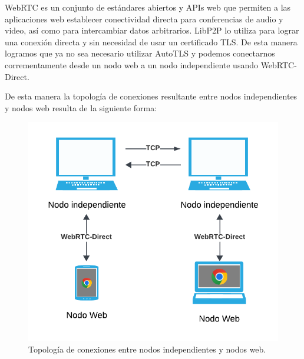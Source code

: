 WebRTC es un conjunto de estándares abiertos y APIs web que permiten a las aplicaciones web establecer conectividad directa para conferencias de audio y video, así como para intercambiar datos arbitrarios. LibP2P lo utiliza para lograr una conexión directa y sin necesidad de usar un certificado TLS. De esta manera logramos que ya no sea necesario utilizar AutoTLS y podemos conectarnos corrementamente desde un nodo web a un nodo independiente usando WebRTC-Direct.

De esta manera la topología de conexiones resultante entre nodos independientes y nodos web resulta de la siguiente forma: 

\begin{figure}[H]
    \centering
    \includegraphics[width=0.5\linewidth]{img/solucion-ipfs/topologia.png}
    \caption{Topología de conexiones entre nodos independientes y nodos web.}
    \label{fig:bdd-articulos}
\end{figure}